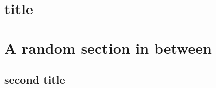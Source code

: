 \documentclass{article}
\begin{document}
\section{title}
\lipsum[1-2]

\pagebreak %
\section{A random section in between}
\lipsum[1-2]

\begin{landscape}
    \section{second title}
    \lipsum[1-2]
\end{landscape}

\lipsum[1-10] %
\end{document}
